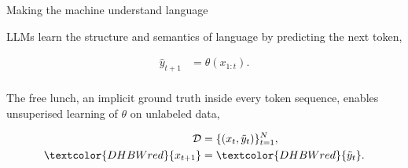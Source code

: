 \begin{frame}{Making the machine understand language}
  \begin{sidebody}
    {\small
    \setlength{\abovedisplayskip}{4pt}\setlength{\belowdisplayskip}{4pt}%
    LLMs learn the structure and semantics of
    language by \alert{predicting the next token},

    \[\begin{aligned}
      \hat{y}_{t+1} &= \theta(x_{1:t}).\\
    \end{aligned}\]


    The free lunch, an implicit ground truth inside every
    token sequence, enables unsuperised learning of $\theta$ on unlabeled data, 

    \[\begin{aligned}
      \mathcal{D} &= \{(x_t, \tilde{y}_t)\}_{t=1}^{N},\\
      \textcolor{DHBWred}{x_{t+1}} &= \textcolor{DHBWred}{\tilde{y}_t}.
    \end{aligned}\]}
  \end{sidebody}
\end{frame}



